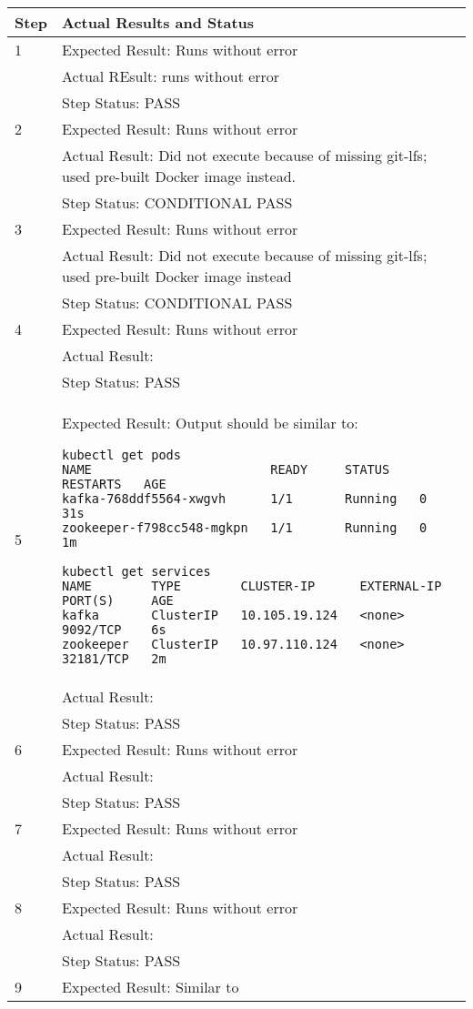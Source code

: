 \documentclass[DM,lsstdraft,STR,toc]{lsstdoc}
\begin{document}
\begin{longtable}{p{2cm}p{14cm}}
\hline
{Step} & {Actual Results and Status}\\ \hline
1 & Expected Result: Runs without error \\\cline{2-2}
  & Actual REsult: runs without error \\\cline{2-2}
  & Step Status: PASS \\\hline
2 & Expected Result: Runs without error \\\cline{2-2}
  & Actual Result: Did not execute because of missing git-lfs; used pre-built Docker image instead. \\\cline{2-2}
  & Step Status: CONDITIONAL PASS \\\hline
3 & Expected Result: Runs without error \\\cline{2-2}
  & Actual Result: Did not execute because of missing git-lfs; used pre-built Docker image instead \\\cline{2-2}
  & Step Status: CONDITIONAL PASS \\\hline
4 & Expected Result: Runs without error \\\cline{2-2}
  & Actual Result: \\\cline{2-2}
  & Step Status: PASS \\\hline
5 & Expected Result: Output should be similar to:

\scriptsize{
\begin{verbatim}
kubectl get pods
NAME                        READY     STATUS    RESTARTS   AGE
kafka-768ddf5564-xwgvh      1/1       Running   0          31s
zookeeper-f798cc548-mgkpn   1/1       Running   0          1m

kubectl get services
NAME        TYPE        CLUSTER-IP      EXTERNAL-IP   PORT(S)     AGE
kafka       ClusterIP   10.105.19.124   <none>        9092/TCP    6s
zookeeper   ClusterIP   10.97.110.124   <none>        32181/TCP   2m
\end{verbatim}
}
\\\cline{2-2}
  & Actual Result: \\\cline{2-2}
  & Step Status: PASS \\\hline
6 & Expected Result: Runs without error \\\cline{2-2}
  & Actual Result: \\\cline{2-2}
  & Step Status: PASS \\\hline
7 & Expected Result: Runs without error \\\cline{2-2}
  & Actual Result: \\\cline{2-2}
  & Step Status: PASS \\\hline
8 & Expected Result: Runs without error \\\cline{2-2}
  & Actual Result: \\\cline{2-2}
  & Step Status: PASS \\\hline
9 & Expected Result: Similar to


\end{longtable}
\end{document}
